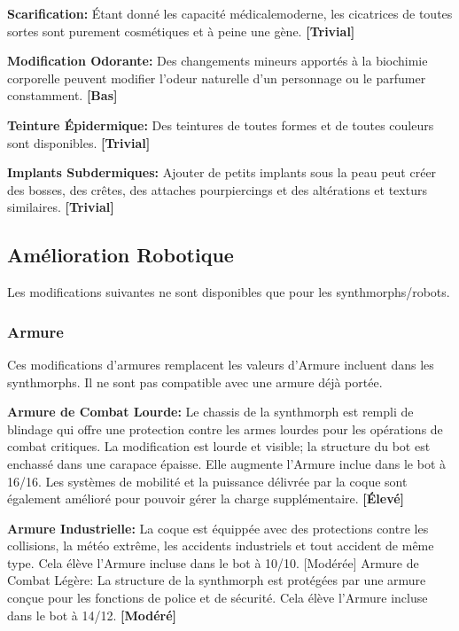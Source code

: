 \textbf{Scarification:} Étant donné les capacité médicalemoderne, les cicatrices de toutes sortes sont purement cosmétiques et à peine une gène. \textbf{[Trivial]} 

\textbf{Modification Odorante:} Des changements mineurs apportés à la biochimie corporelle peuvent modifier l'odeur naturelle d'un personnage ou le parfumer constamment. \textbf{[Bas]} 

\textbf{Teinture Épidermique:} Des teintures de toutes formes et de toutes couleurs sont disponibles. \textbf{[Trivial]} 

\textbf{Implants Subdermiques:} Ajouter de petits implants sous la peau peut créer des bosses, des crêtes, des attaches pourpiercings et des altérations et texturs similaires. \textbf{[Trivial]} 

\subsection{Amélioration Robotique} \label{sec:robotic-enhancements} 

Les modifications suivantes ne sont disponibles que pour les synthmorphs/robots. 

\subsubsection{Armure} 

Ces modifications d'armures remplacent les valeurs d'Armure incluent dans les synthmorphs. Il ne sont pas compatible avec une armure déjà portée. 

\textbf{Armure de Combat Lourde:} Le chassis de la synthmorph est rempli de blindage qui offre une protection contre les armes lourdes pour les opérations de combat critiques. La modification est lourde et visible; la structure du bot est enchassé dans une carapace épaisse. Elle augmente l'Armure inclue dans le bot à 16/16. Les systèmes de mobilité et la puissance délivrée par la coque sont également amélioré pour pouvoir gérer la charge supplémentaire. \textbf{[Élevé]} 

\textbf{Armure Industrielle:} La coque est équippée avec des protections contre les collisions, la météo extrême, les accidents industriels et tout accident de même type. Cela élève l'Armure incluse dans le bot à 10/10. [Modérée] Armure de Combat Légère: La structure de la synthmorph est protégées par une armure conçue pour les fonctions de police et de sécurité. Cela élève l'Armure incluse dans le bot à 14/12. \textbf{[Modéré]} 

